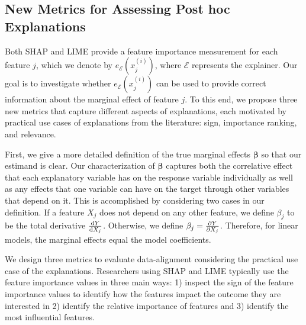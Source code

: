 \documentclass[12pt]{article}  %
\newcommand{\mE}{\mathcal{E}}
\begin{document}
\subsection{New Metrics for Assessing Post hoc Explanations}
   \label{sec:evaluating_faithfulness}
  Both SHAP and LIME provide a feature importance measurement for each feature $j$, which we denote by $e_\mE(x^{(i)}_j)$, where $\mE$ represents the explainer.
   Our goal is to investigate whether $e_\mE(x^{(i)}_j)$ can be used to provide correct information about the marginal effect of feature $j$. To this end, we propose three new metrics that capture different aspects of explanations, each motivated by practical use cases of explanations from the literature: sign, importance ranking, and relevance. 
     
     First, we give a more detailed definition of the true marginal effects $\boldsymbol{\beta}$ so that our estimand is clear. Our characterization of $\boldsymbol{\beta}$ captures both the correlative effect that each explanatory variable has on the response variable individually as well as any effects that one variable can have on the target through other variables that depend on it. This is accomplished by considering two cases in our definition. If a feature $X_j$ does not depend on any other feature, we define $\beta_j$ to be the total derivative $\dv{Y}{X_j}$. Otherwise, we define $\beta_j = \pdv{Y}{X_j}$. Therefore, for linear models, the marginal effects equal the model coefficients.



         
          We design three metrics to evaluate data-alignment  considering the practical use case of the explanations. Researchers using SHAP and LIME typically use the feature importance values in three main ways: 1) inspect the sign of the feature importance values to identify how the features impact the outcome they are interested in %
         2)  identify the relative importance of features %
         and 3) identify the most influential features. %
\end{document}
